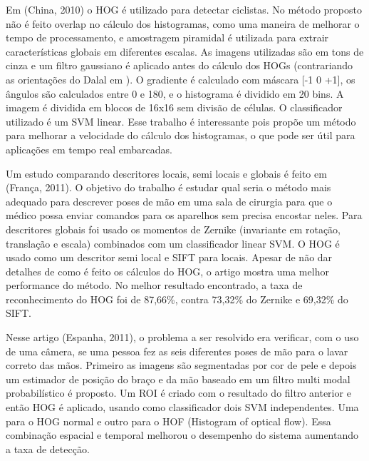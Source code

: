 Em \cite{ref6} (China, 2010) o HOG é utilizado para detectar ciclistas. No método proposto não é feito overlap no cálculo dos histogramas, como uma maneira de melhorar o tempo de processamento, e amostragem piramidal é utilizada para extrair características globais em diferentes escalas. As imagens utilizadas são em tons de cinza e um filtro gaussiano é aplicado antes do cálculo dos HOGs (contrariando as orientações do Dalal em \cite{dalal}). O gradiente é calculado com máscara [-1 0 +1], os ângulos são calculados entre 0 e 180, e o histograma é dividido em 20 bins. A imagem é dividida em blocos de 16x16 sem divisão de células. O classificador utilizado é um SVM linear. Esse trabalho é interessante pois propõe um método para melhorar a velocidade do cálculo dos histogramas, o que pode ser útil para aplicações em tempo real embarcadas.

Um estudo comparando descritores locais, semi locais e globais é feito em \cite{ref7} (França, 2011). O objetivo do trabalho é estudar qual seria o método mais adequado para descrever poses de mão em uma sala de cirurgia para que o médico possa enviar comandos para os aparelhos sem precisa encostar neles. Para descritores globais foi usado os momentos de Zernike (invariante em rotação, translação e escala) combinados com um classificador linear SVM. O HOG é usado como um descritor semi local e SIFT para locais. Apesar de não dar detalhes de como é feito os cálculos do HOG, o artigo mostra uma melhor performance do método. No melhor resultado encontrado, a taxa de reconhecimento do HOG foi de 87,66\%, contra 73,32\% do Zernike e 69,32\% do SIFT.

Nesse artigo \cite{ref16} (Espanha, 2011), o problema a ser resolvido era verificar, com o uso de uma câmera, se uma pessoa  fez as seis diferentes poses de mão para o lavar correto das mãos. Primeiro as imagens são segmentadas por cor de pele e depois um estimador de posição do braço e da mão baseado em um filtro multi modal probabilístico é proposto. Um ROI é criado com o resultado do filtro anterior e então HOG é aplicado, usando como classificador dois SVM independentes. Uma para o HOG normal e outro para o HOF (Histogram of optical flow). Essa combinação espacial e temporal melhorou o desempenho do sistema aumentando a taxa de detecção.

